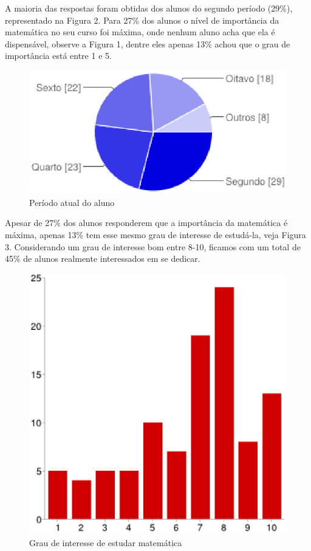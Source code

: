 \documentclass[12pt,a4paper]{article}
\begin{document}
A maioria das respostas foram obtidas dos alunos do segundo período (29\%), representado na Figura 2. Para 27\% dos alunos o nível de importância da matemática no seu curso foi máxima, onde nenhum aluno acha que ela é dispensável, observe a Figura 1, dentre eles apenas 13\% achou que o grau de importância está entre 1 e 5. 

\begin{figure}[htb]
	\center
	\includegraphics[scale=0.7]{imagens/2.eps} 
	\caption{Período atual do aluno}
	\label{img:grafPeriodoAtual}
\end{figure}

Apesar de 27\% dos alunos responderem que a importância da matemática é máxima, apenas 13\% tem esse mesmo grau de interesse de estudá-la, veja Figura 3. Considerando um grau de interesse bom entre 8-10, ficamos com um total de 45\% de alunos realmente interessados em se dedicar. 

\begin{figure}[htb]
	\center
	\includegraphics[scale=0.45]{imagens/3.eps} 
	\caption{Grau de interesse de estudar matemática}
	\label{fig:grafInteresse}
\end{figure}
\end{document}

